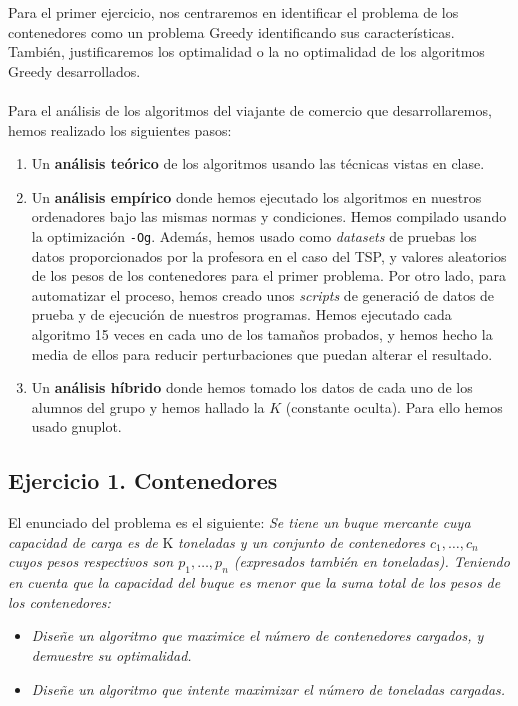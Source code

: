 \documentclass[10pt,a4paper]{article}
\begin{document}
Para el primer ejercicio, nos centraremos en identificar el problema de los contenedores como un problema Greedy identificando sus características. También, justificaremos los optimalidad o la no optimalidad de los algoritmos Greedy desarrollados.
\\
\\
Para el análisis de los algoritmos del viajante de comercio que desarrollaremos, hemos realizado los siguientes pasos:

\begin{enumerate}
	\item Un \textbf{análisis teórico} de los algoritmos usando las técnicas vistas en clase.
	
	\item Un \textbf{análisis empírico} donde hemos ejecutado los algoritmos en nuestros ordenadores bajo las mismas normas y condiciones. Hemos compilado usando la optimización \texttt{-Og}. Además, hemos usado como \textit{datasets} de pruebas los datos proporcionados por la profesora en el caso del TSP, y valores aleatorios de los pesos de los contenedores para el primer problema. Por otro lado, para automatizar el proceso, hemos creado unos \textit{scripts} de generació  de datos de prueba y de ejecución de nuestros programas. Hemos ejecutado cada algoritmo 15 veces en cada uno de los tamaños probados, y hemos hecho la media de ellos para reducir perturbaciones que puedan alterar el resultado.
	
	\item Un \textbf{análisis híbrido} donde hemos tomado los datos de cada uno de los alumnos del grupo y hemos hallado la \(K\) (constante oculta). Para ello hemos usado gnuplot.
\end{enumerate}

\subsection{Ejercicio 1. Contenedores}

El enunciado del problema es el siguiente: \textit{Se tiene un buque mercante cuya capacidad de carga es de } K \textit{toneladas y un conjunto de contenedores \(c_1, \dotsc, c_n\) cuyos pesos respectivos son \(p_1, \dotsc, p_n\) (expresados también en toneladas). Teniendo en cuenta que la capacidad del buque es menor que la suma total de los pesos de los contenedores: }

\begin{itemize}
	\item \textit{Diseñe un algoritmo que maximice el número de contenedores cargados, y demuestre su optimalidad.}
	\item \textit{Diseñe un algoritmo que intente maximizar el número de toneladas cargadas.}
\end{itemize}
\end{document}
